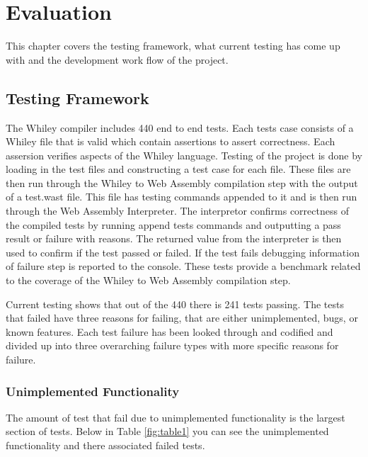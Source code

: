 \chapter{Evaluation}\label{C:t}

This chapter covers the testing framework, what current testing has come up with and the development work flow of the project.

\section{Testing Framework}

The Whiley compiler includes 440 end to end tests. Each tests case consists of a Whiley file that is valid which contain assertions to assert correctness. Each assersion verifies aspects of the Whiley language. Testing of the project is done by loading in the test files and constructing a test case for each file. These files are then run through the Whiley to Web Assembly compilation step with the output of a test.wast file. This file has testing commands appended to it and is then run through the Web Assembly Interpreter. The interpretor confirms correctness of the compiled tests by running append tests commands and outputting a pass result or failure with reasons.%
The returned value from the interpreter is then used to confirm if the test passed or failed. If the test fails debugging information of failure step is reported to the console. These tests provide a benchmark related to the coverage of the Whiley to Web Assembly compilation step.  

Current testing shows that out of the 440 there is 241 tests passing. The tests that failed have three reasons for failing, that are either unimplemented, bugs, or known features. Each test failure has been looked through and codified and divided up into three overarching failure types with more specific reasons for failure.

\subsection{Unimplemented Functionality}

The amount of test that fail due to unimplemented functionality is the largest section of tests. %
Below in Table \ref{fig:table1} you can see the unimplemented functionality and there associated failed tests. 

